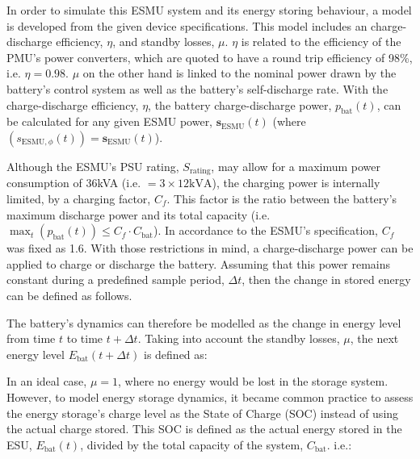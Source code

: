 In order to simulate this ESMU system and its energy storing behaviour, a model is developed from the given device specifications.
This model includes an charge-discharge efficiency, $\eta$, and standby losses, $\mu$.
$\eta$ is related to the efficiency of the PMU's power converters, which are quoted to have a round trip efficiency of 98\%, i.e. $\eta = 0.98$.
$\mu$ on the other hand is linked to the nominal power drawn by the battery's control system as well as the battery's self-discharge rate.
With the charge-discharge efficiency, $\eta$, the battery charge-discharge power, $p_\text{bat}(t)$, can be calculated for any given ESMU power, $\textbf{s}_\text{ESMU}(t)$ (where $(s_{\text{ESMU},\phi}(t)) = \textbf{s}_\text{ESMU}(t)$).




Although the ESMU's PSU rating, $S_\text{rating}$, may allow for a maximum power consumption of 36kVA (i.e. $=3\times12\text{kVA}$), the charging power is internally limited, by a charging factor, $C_f$.
This factor is the ratio between the battery's maximum discharge power and its total capacity (i.e. $\max_t (p_\text{bat}(t)) \leq C_f \cdot C_\text{bat}$).
In accordance to the ESMU's specification, $C_f$ was fixed as 1.6.
With those restrictions in mind, a charge-discharge power can be applied to charge or discharge the battery.
Assuming that this power remains constant during a predefined sample period, $\Delta t$, then the change in stored energy can be defined as follows.



\nomenclature[I]{$\mu$}{Self-discharge losses of battery, where $\mu \in (0, 1]$ (Chapter \ref{ch1})}

The battery's dynamics can therefore be modelled as the change in energy level from time $t$ to time $t+\Delta t$.
Taking into account the standby losses, $\mu$, the next energy level $E_\text{bat}(t+\Delta t)$ is defined as:



In an ideal case, $\mu = 1$, where no energy would be lost in the storage system.
However, to model energy storage dynamics, it became common practice to assess the energy storage's charge level as the State of Charge (SOC) instead of using the actual charge stored.
This SOC is defined as the actual energy stored in the ESU, $E_\text{bat}(t)$, divided by the total capacity of the system, $C_\text{bat}$. i.e.:

